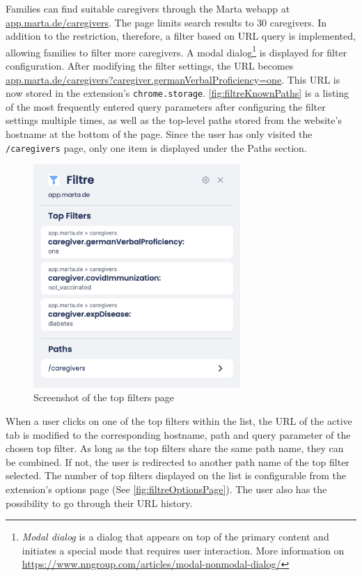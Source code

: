 Families can find suitable caregivers through the Marta webapp at \url{app.marta.de/caregivers}. The page limits search results to 30 caregivers. In addition to the restriction, therefore, a filter based on URL query is implemented, allowing families to filter more caregivers. A modal dialog\footnote{\emph{Modal dialog} is a dialog that appears on top of the primary content and initiates a special mode that requires user interaction. More information on \url{https://www.nngroup.com/articles/modal-nonmodal-dialog/}} is displayed for filter configuration. After modifying the filter settings, the URL becomes \url{app.marta.de/caregivers?caregiver.germanVerbalProficiency=one}. This URL is now stored in the extension's \texttt{chrome.storage}. \autoref{fig:filtreKnownPaths} is a listing of the most frequently entered query parameters after configuring the filter settings multiple times, as well as the top-level paths stored from the website's hostname at the bottom of the page. Since the user has only visited the \texttt{/caregivers} page, only one item is displayed under the Paths section.

\begin{figure}[H]
  \centering
  \includegraphics[width=0.7\textwidth]{assets/screenshot_filtre_top_filters.png}
  \caption{Screenshot of the top filters page}
  \label{fig:filtreKnownPaths}
\end{figure}

When a user clicks on one of the top filters within the list, the URL of the active tab is modified to the corresponding hostname, path and query parameter of the chosen top filter. As long as the top filters share the same path name, they can be combined. If not, the user is redirected to another path name of the top filter selected. The number of top filters displayed on the list is configurable from the extension's options page (See \autoref{fig:filtreOptionsPage}). The user also has the possibility to go through their URL history.

